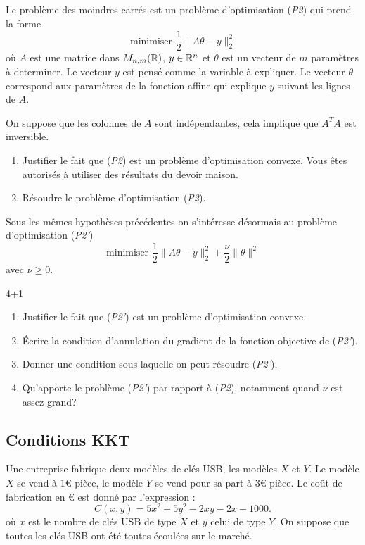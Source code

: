 \documentclass[11pt, a4paper]{article}
\begin{document}
Le problème des moindres carrés est un problème d'optimisation
(\emph{P2}) qui prend la forme
\[
\textrm{minimiser  } \frac{1}{2}\| A\theta - y\|_2^2
\]
où $A$ est une matrice dans $M_{n, m}(\mathbb{R})$, $y \in \mathbb{R}^n$ et $\theta$
est un vecteur de $m$ paramètres à determiner. Le vecteur $y$ est
pensé comme la variable à expliquer. Le vecteur $\theta$ correspond
aux paramètres de la fonction affine qui explique $y$ suivant les
lignes de $A$.
\begin{question}{3}
  On suppose que les colonnes de $A$ sont indépendantes, cela implique
  que $A^TA$ est inversible.
  \begin{enumerate}
  \item Justifier le fait que (\emph{P2}) est un problème
    d'optimisation convexe. Vous êtes autorisés à utiliser des
    résultats du devoir maison.
  \item Résoudre le problème d'optimisation (\emph{P2}).
  \end{enumerate}
\end{question}
Sous les mêmes hypothèses précédentes on s'intéresse désormais au
problème d'optimisation (\emph{P2'})
\[
\textrm{minimiser } \frac{1}{2}\| A\theta - y\|_2^2 +
\frac{\nu}{2}\|\theta\|^2
\]
avec $\nu \geq 0$.
\begin{question}{4+1}
  \begin{enumerate}
  \item Justifier le fait que (\emph{P2'}) est un problème
    d'optimisation convexe.
  \item Écrire la condition d'annulation du gradient de la fonction
    objective de (\emph{P2'}).
  \item Donner une condition sous laquelle on peut résoudre
    (\emph{P2'}).
  \item Qu'apporte le problème (\emph{P2'}) par rapport à (\emph{P2}),
    notamment quand $\nu$ est assez grand?
  \end{enumerate}
\end{question}

\subsection{Conditions KKT}

Une entreprise fabrique deux modèles de clés USB, les modèles $X$ et
$Y$. Le modèle $X$ se vend à $1$\euro{} pièce, le modèle $Y$ se vend pour
sa part à $3$\euro{} pièce. Le coût de fabrication en \euro{} est donné par
l'expression :
\[
C(x, y) = 5x^2 + 5y^2 - 2xy - 2x - 1000.
\]
où $x$ est le nombre de clés USB de type $X$ et $y$ celui de type
$Y$. On suppose que toutes les clés USB ont été toutes écoulées sur le
marché.
\end{document}
